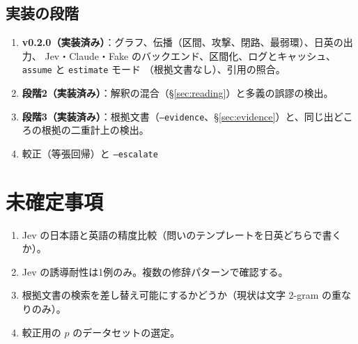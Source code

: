 \documentclass[a4paper,11pt]{ltjsarticle}
\begin{document}
\subsection{実装の段階}

\begin{enumerate}
  \item \textbf{v0.2.0（実装済み）}：グラフ、伝播（区間、攻撃、閉路、最弱環）、日英の出力、
        Jev・Claude・Fake のバックエンド、区間化、ログとキャッシュ、\texttt{assume} と \texttt{estimate} モード
        （根拠文書なし）、引用の照合。
  \item \textbf{段階2（実装済み）}：解釈の混合（§\ref{sec:reading}）と多義の誤謬の検出。
  \item \textbf{段階3（実装済み）}：根拠文書（\texttt{--evidence}、§\ref{sec:evidence}）と、同じ出どころの根拠の二重計上の検出。
  \item 較正（等張回帰）と \texttt{--escalate}
\end{enumerate}

\section{未確定事項}

\begin{enumerate}
  \item Jev の日本語と英語の精度比較（問いのテンプレートを日英どちらで書くか）。
  \item Jev の誘導耐性は1例のみ。複数の修辞パターンで確認する。
  \item 根拠文書の検索を差し替え可能にするかどうか（現状は文字 2-gram の重なりのみ）。
  \item 較正用の $p$ のデータセットの選定。
\end{enumerate}
\end{document}

